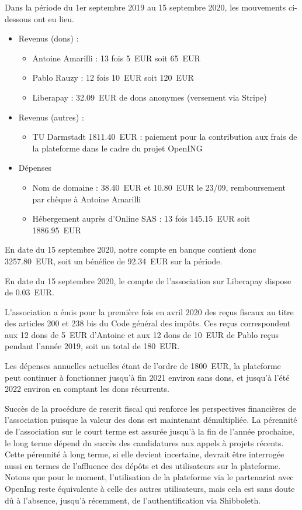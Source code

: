 \documentclass[a4paper]{article}
\begin{document}
Dans la période du 1er septembre 2019 au 15 septembre 2020, les mouvements ci-dessous ont eu lieu.
\begin{itemize}
\item Revenus (dons) :
  \begin{itemize}
    \item Antoine Amarilli : 13 fois 5~EUR soit 65~EUR
    \item Pablo Rauzy : 12 fois 10~EUR soit 120~EUR
    \item Liberapay : 32.09~EUR de dons anonymes (versement via Stripe)
  \end{itemize}
\item Revenus (autres) :
\begin{itemize}
    \item TU Darmstadt 1811.40~EUR : paiement pour la contribution aux frais de la plateforme dans le cadre du projet OpenING
\end{itemize}
\item Dépenses
  \begin{itemize}
    \item Nom de domaine : 38.40~EUR et 10.80~EUR le 23/09, remboursement par chèque à Antoine Amarilli
    \item Hébergement auprès d'Online SAS : 13 fois 145.15~EUR soit 1886.95~EUR
  \end{itemize}
\end{itemize}

En date du 15 septembre 2020, notre compte en banque contient donc 3257.80~EUR, soit un bénéfice de 92.34~EUR sur la période.

En date du 15 septembre 2020, le compte de l'association sur Liberapay dispose de 0.03~EUR.

L'association a émis pour la première fois en avril 2020 des reçus fiscaux au titre des articles 200 et 238 bis du Code général des impôts. Ces reçus correspondent aux 12 dons de 5~EUR d'Antoine et aux 12 dons de 10~EUR de Pablo reçus pendant l'année 2019, soit un total de 180~EUR.

Les dépenses annuelles actuelles étant de l'ordre de 1800~EUR, la plateforme peut continuer à fonctionner jusqu'à fin 2021 environ sans dons, et jusqu'à l'été 2022 environ en comptant les dons récurrents.


Succès de la procédure de rescrit fiscal qui renforce les perspectives financières de l'association puisque la valeur des dons est maintenant démultipliée. La pérennité de l'association sur le court terme est assurée jusqu'à la fin de l'année prochaine, le long terme dépend du succès des candidatures aux appels à projets récents. Cette pérennité à long terme, si elle devient incertaine, devrait être interrogée aussi en termes de l'affluence des dépôts et des utilisateurs sur la plateforme. 
Notons que pour le moment, l'utilisation de la plateforme via le partenariat avec OpenIng reste équivalente à celle des autres utilisateurs, mais cela est sans doute dû à l'absence, jusqu'à récemment, de l'authentification via Shibboleth. 
\end{document}
